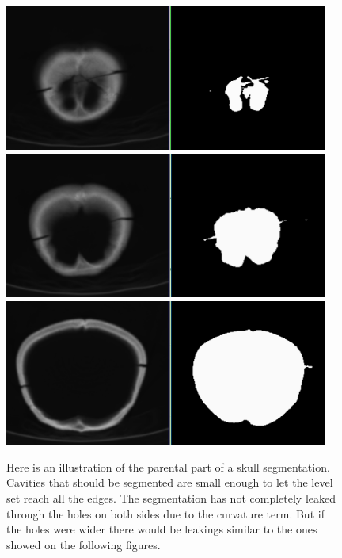 \begin{figure}
    \centering
    \includegraphics[width=0.95\textwidth]{data/png/2}
    \includegraphics[width=0.95\textwidth]{data/png/4}
    \includegraphics[width=0.95\textwidth]{data/png/7}
    \caption[Result of segmentation of parietal part of a skull]
{
Here is an illustration of the parental part of a skull segmentation.
Cavities that should be segmented are small enough to let the level set reach all the edges.
The segmentation has not completely leaked through the holes on both sides due to the curvature term.
But if the holes were wider there would be leakings similar to the ones showed on the following figures.
}
    \label{fg:parietalSlicesSegmentation}
\end{figure}

